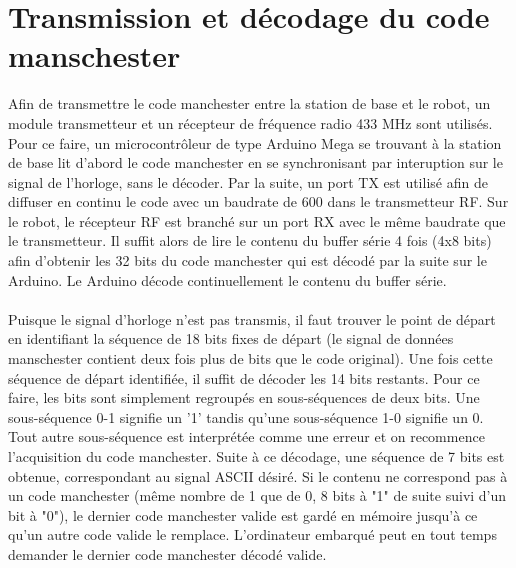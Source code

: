 \section{Transmission et décodage du code manschester}

Afin de transmettre le code manchester entre la station de base et le robot, un module transmetteur et un récepteur de fréquence radio 433 MHz sont utilisés.
Pour ce faire, un microcontrôleur de type Arduino Mega se trouvant à la station de base lit d'abord le code manchester en se synchronisant par interuption
sur le signal de l'horloge, sans le décoder. Par la suite, un port TX est utilisé afin de diffuser en continu le code avec un baudrate de 600 dans le transmetteur
RF. Sur le robot, le récepteur RF est branché sur un port RX avec le même baudrate que le transmetteur. Il suffit alors de lire le contenu du buffer
série 4 fois (4x8 bits) afin d'obtenir les 32 bits du code manchester qui est décodé par la suite sur le Arduino. Le Arduino décode continuellement le
contenu du buffer série.
\paragraph{}
Puisque le signal d'horloge n'est pas transmis, il faut trouver le point de départ en identifiant la séquence de 18 bits fixes de départ
(le signal de données manschester contient deux fois plus de bits que le code original). Une fois cette séquence de départ identifiée,
il suffit de décoder les 14 bits restants. Pour ce faire, les bits sont simplement regroupés en sous-séquences de deux bits.
Une sous-séquence 0-1 signifie un '1' tandis qu'une sous-séquence 1-0 signifie un 0. Tout autre sous-séquence est interprétée comme une erreur et on recommence
l'acquisition du code manchester. Suite à ce décodage, une séquence de 7 bits est obtenue, correspondant au signal ASCII désiré. Si le contenu ne correspond
pas à un code manchester (même nombre de 1 que de 0, 8 bits à "1" de suite suivi d'un bit à "0"), le dernier code manchester valide est
gardé en mémoire jusqu'à ce qu'un autre code valide le remplace. L'ordinateur embarqué peut en tout temps demander le dernier code manchester décodé valide.
